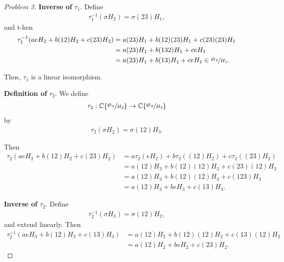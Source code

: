 \documentclass[titlepage]{article}
\theoremstyle{plain}
\theoremstyle{definition}
\theoremstyle{remark}
\theoremstyle{exercise-style}
\numberwithin{equation}{section}
\numberwithin{theorem}{section}
\numberwithin{remark}{section}
\begin{document}
\begin{proof}[Problem 3]
    \textbf{Inverse of } $\tau_1$.
    Define
    \begin{align}
        \tau_1^{-1}(\sigma H_2) = \sigma(23)H_1,
    \end{align}
    and t-hen
    \begin{align}
        \tau_1^{-1}(a eH_2 + b(12)H_2 + c(23)H_2)
        &= a(23)H_1 + b(12)(23)H_1 + c(23)(23)H_1 \\
        &= a(23)H_1 + b(132)H_1 + c eH_1 \\
        &= a(23)H_1 + b(13)H_1 + c eH_1 \in \sfrac{\mathfrak{S}_3}{H_1}.
    \end{align}
    
    Thus, $\tau_1$ is a linear isomorphism.
    
    \textbf{Definition of } $\tau_2$.
    We define
    \begin{align}
        \tau_2 : \mathbb{C}\{ \sfrac{\mathfrak{S}_3}{H_2} \} \to \mathbb{C}\{ \sfrac{\mathfrak{S}_3}{H_3} \}
    \end{align}
    by
    \begin{align}
        \tau_2(\sigma H_2) = \sigma (12)H_3.
    \end{align}
    
    Then
    \begin{align}
        \tau_2(a eH_2 + b(12)H_2 + c(23)H_2)
        &= a\tau_2(eH_2) + b\tau_2((12)H_2) + c\tau_2((23)H_2) \\
        &= a(12)H_3 + b(12)(12)H_3 + c(23)(12)H_3 \\
        &= a(12)H_3 + b(12)(12)H_3 + c(123)H_3 \\
        &= a(12)H_3 + b eH_3 + c(13)H_3.
    \end{align}
    
    \textbf{Inverse of } $\tau_2$.
    Define
    \begin{align}
        \tau_2^{-1}(\sigma H_3) = \sigma (12)H_2,
    \end{align}
    and extend linearly. Then
    \begin{align}
        \tau_2^{-1}(a eH_3 + b(12)H_3 + c(13)H_3)
        &= a(12)H_2 + b(12)(12)H_2 + c(13)(12)H_2 \\
        &= a(12)H_2 + b eH_2 + c(23)H_2.
    \end{align}
    

\end{proof}
\end{document}
